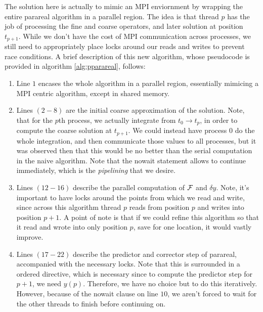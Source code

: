 The solution here is actually to mimic an MPI enviornment by wrapping the
entire parareal algorithm in a parallel region. The idea is that thread $p$ has
the job of processing the fine and coarse operators, and later solution at
position $t_{p+1}$. While we don't have the cost of MPI communication across
processes, we still need to appropriately place locks around our reads and
writes to prevent race conditions. A brief description of this new algorithm,
whose pseudocode is provided in algorithm \ref{alg:pparareal}, follows:
\begin{enumerate}[(1)]
  \item Line $1$ encases the whole algorithm in a parallel region, essentially
    mimicing a MPI centric algorithm, except in shared memory. 
  \item Lines $(2-8)$ are the initial coarse approximation of the solution.
    Note, that for the $p$th process, we actually integrate from $t_0 \to t_p$,
    in order to compute the coarse solution at $t_{p+1}$. We could instead have
    process $0$ do the whole integration, and then communicate those values to
    all processes, but it was observed then that this would be no better than
    the serial computation in the naive algorithm. Note that the nowait
    statement allows to continue immediately, which is the \textit{pipelining}
    that we desire.
  \item Lines $(12-16)$ describe the parallel computation of $\mathcal{F}$ and $\delta
    y$. Note, it's important to have locks around the points from which we read
    and write, since across this algorithm thread $p$ reads from position $p$
    and writes into position $p+1$. A point of note is that if we could refine
    this algorithm so that it read and wrote into only position $p$, save for
    one location, it would vastly improve.
  \item Lines $(17-22)$ describe the predictor and corrector step of parareal,
    accompanied with the necessary locks. Note that this is surrounded in a
    ordered directive, which is necessary since to compute the predictor step
    for $p+1$, we need $y(p)$. Therefore, we have no choice but to do this
    iteratively. However, because of the nowait clause on line $10$, we aren't
    forced to wait for the other threads to finish before continuing on.
\end{enumerate}
